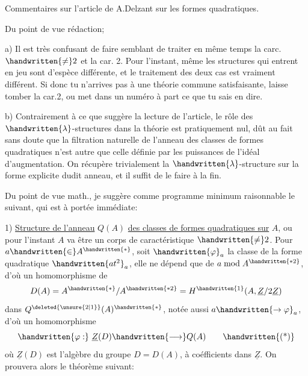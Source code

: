 \begin{flushright}\end{flushright}

\begin{center}Commentaires sur l'article de A.Delzant sur les formes quadratiques.\end{center}

Du point de vue rédaction;

a) Il est très confusant de faire semblant de traiter en même temps la carc. $\handwritten{\ne}2$ et la car. 2. Pour l'instant, même les structures qui entrent en jeu sont d'espèce différente, et le traitement des deux cas est vraiment différent. Si donc tu n'arrives pas à une théorie commune satisfaisante, laisse tomber la car.2, ou met dans un numéro à part ce que tu sais en dire.

b) Contrairement à ce que suggère la lecture de l'article, le rôle des $\handwritten{\lambda}$-structures dans la théorie est pratiquement nul, dût au fait sans doute que la filtration naturelle de l'anneau des classes de formes quadratiques n'est autre que celle définie par les puissances de l'idéal d'augmentation. On récupère trivialement la $\handwritten{\lambda}$-structure sur la forme explicite dudit anneau, et il suffit de le faire à la fin.

 Du point de vue math., je suggère comme programme minimum raisonnable le suivant, qui est à portée immédiate:

1) \uline{Structure de l'anneau} $Q(A)$ \uline{des classes de formes quadratiques sur} $A$, ou pour l'instant $A$ va être un corps de caractéristique $\handwritten{\ne}2$. Pour $a\handwritten{\in}A^{\handwritten{*}}$, soit $\handwritten{\varphi}_a$ la classe de la forme quadratique $\handwritten{at^2}_{a}$, elle ne dépend que de $a\bmod A^{\handwritten{*2}}$, d'où un homomorphisme de
\[
D(A)=A^{\handwritten{*}}/A^{\handwritten{*2}}=H^{\handwritten{1}}(A,\underline{Z}/2\underline{Z})
\]
dans $Q^{\deleted{\unsure{2|1}}}(A)^{\handwritten{*}}$, notée aussi $a\handwritten{\to\varphi}_a$, d'où un homomorphisme
\[
\handwritten{\varphi:}\ \underline{Z}(D)\handwritten{\longrightarrow}Q(A)
\tag*{\handwritten{(*)}}
\]
où $\underline{Z}(D)$ est l'algèbre du groupe $D=D(A)$, à coéfficients dans $\underline{Z}$. On prouvera alors le théorème suivant:

